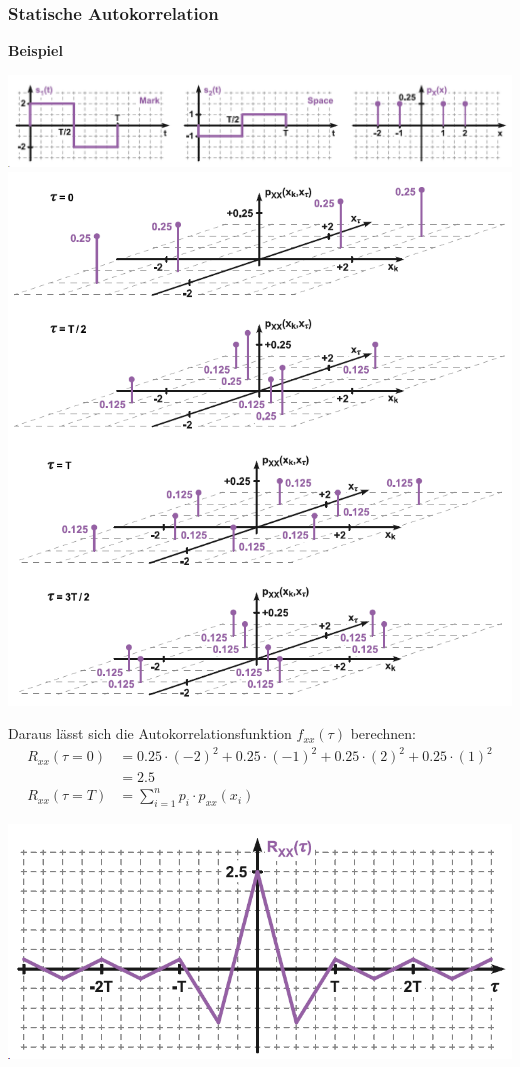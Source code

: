 \subsubsection{Statische Autokorrelation}
\textbf{Beispiel}
\begin{center}
	\includegraphics[width=\columnwidth]{Images/statische_ak1}
\includegraphics[width=0.8\columnwidth]{Images/statische_ak2}
\end{center}

Daraus lässt sich die Autokorrelationsfunktion $f_{xx}(\tau)$ berechnen:
\begin{align*}
	R_{xx}(\tau = 0) &= 0.25\cdot(-2)^2 + 0.25\cdot (-1)^2+  0.25\cdot(2)^2 + 0.25\cdot (1)^2 \\ &= 2.5 \\
	R_{xx}(\tau = T) &= \sum_{i = 1}^{n}p_i \cdot p_{xx}(x_i) 
\end{align*}

\begin{center}
	\includegraphics[width=0.6\columnwidth]{Images/statische_ak3}
\end{center}



